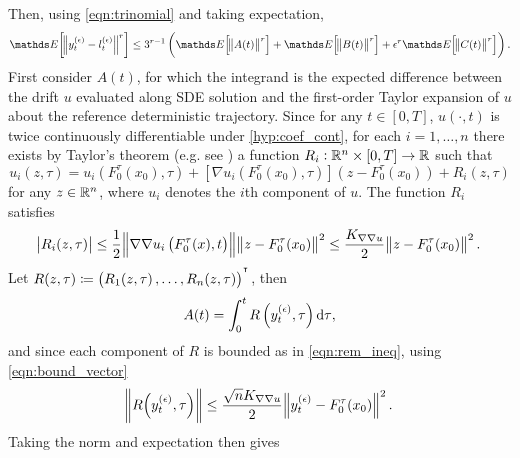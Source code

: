 Then, using \cref{eqn:trinomial} and taking expectation,
\begin{equation}
	\avg{\norm{y_t^{(\epsilon)} - l_t^{(\epsilon)}}^r} \leq 3^{r-1}\left(\avg{\norm{A(t)}^r} + \avg{\norm{B(t)}^r} + \epsilon^r\avg{\norm{C(t)}^r}\right) .
	\label{eqn:diff_decomp}
\end{equation}
First consider \(A(t)\), for which the integrand is the expected difference between the drift \(u\) evaluated along SDE solution and the first-order Taylor expansion of \(u\) about the reference deterministic trajectory.
Since for any \(t \in [0,T]\), \(u\left(\cdot, t\right)\) is twice continuously differentiable under \ref{hyp:coef_cont}, for each \(i = 1,\hdots,n\) there exists by Taylor's theorem (e.g. see \cite[Cor. A9.3.]{HubbardHubbard_2009_VectorCalculusLinear}) a function \(R_i: \mathbb{R}^n \times [0,T] \to \mathbb{R}\) such that
\begin{equation}
	u_i\!\left(z, \tau\right) = u_i\!\left(F_0^\tau\!\left(x_0\right), \tau\right) + \left[\nabla u_i\left(F_0^\tau\!\left(x_0\right), \tau\right)\right]\left(z - F_0^\tau\!\left(x_0\right)\right) + R_i\!\left(z, \tau\right)
	\label{eqn:taylor_expan}
\end{equation}
for any \(z \in \mathbb{R}^n\), where \(u_i\) denotes the \(i\)th component of \(u\).
The function \(R_i\) satisfies
\begin{equation}
	\abs{R_i(z, \tau)} \leq \frac12\norm{\nabla\nabla u_i\left(F_0^\tau(x), t\right)}\norm{z - F_0^\tau\!\left(x_0\right)}^2 \leq \frac{K_{\nabla\nabla u}}{2}\norm{z - F_0^\tau\!\left(x_0\right)}^2.
	\label{eqn:rem_ineq}
\end{equation}
Let \(R\!\left(z, \tau\right) \coloneqq \left( R_1\!\left(z, \tau\right), \hdots, R_n\!\left(z, \tau\right)\right)^{^{\intercal}}\), then
\[
	A(t) = \int_0^t{R\left(y_{t}^{(\epsilon)}, \tau\right)\dif\tau},
\]
and since each component of \(R\) is bounded as in \cref{eqn:rem_ineq}, using \cref{eqn:bound_vector}
\[
	\norm{R\!\left(y_t^{(\epsilon)}, \tau\right)} \leq \frac{\sqrt{n} K_{\nabla\nabla u}}{2}\norm{y_t^{(\epsilon)} - F_0^\tau\!\left(x_0\right)}^2.
\]
Taking the norm and expectation then gives
